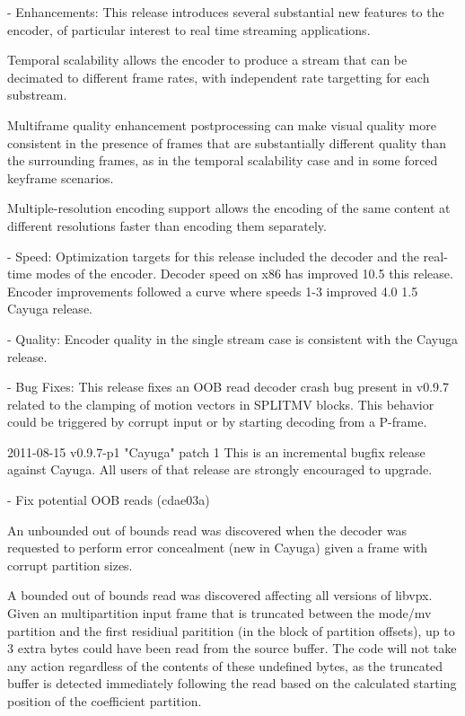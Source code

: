 \begin{DoxyVerbInclude}
  - Enhancements:
      This release introduces several substantial new features to the encoder,
      of particular interest to real time streaming applications.

      Temporal scalability allows the encoder to produce a stream that can
      be decimated to different frame rates, with independent rate targetting
      for each substream.

      Multiframe quality enhancement postprocessing can make visual quality
      more consistent in the presence of frames that are substantially
      different quality than the surrounding frames, as in the temporal
      scalability case and in some forced keyframe scenarios.

      Multiple-resolution encoding support allows the encoding of the
      same content at different resolutions faster than encoding them
      separately.

  - Speed:
      Optimization targets for this release included the decoder and the real-
      time modes of the encoder. Decoder speed on x86 has improved 10.5%
      this release. Encoder improvements followed a curve where speeds 1-3
      improved 4.0%
      1.5%
      Cayuga release.

  - Quality:
      Encoder quality in the single stream case is consistent with the Cayuga
      release.

  - Bug Fixes:
      This release fixes an OOB read decoder crash bug present in v0.9.7
      related to the clamping of motion vectors in SPLITMV blocks. This
      behavior could be triggered by corrupt input or by starting
      decoding from a P-frame.


2011-08-15 v0.9.7-p1 "Cayuga" patch 1
  This is an incremental bugfix release against Cayuga. All users of that
  release are strongly encouraged to upgrade.

    - Fix potential OOB reads (cdae03a)

          An unbounded out of bounds read was discovered when the
          decoder was requested to perform error concealment (new in
          Cayuga) given a frame with corrupt partition sizes.

          A bounded out of bounds read was discovered affecting all
          versions of libvpx. Given an multipartition input frame that
          is truncated between the mode/mv partition and the first
          residiual paritition (in the block of partition offsets), up
          to 3 extra bytes could have been read from the source buffer.
          The code will not take any action regardless of the contents
          of these undefined bytes, as the truncated buffer is detected
          immediately following the read based on the calculated
          starting position of the coefficient partition.


\end{DoxyVerbInclude}

